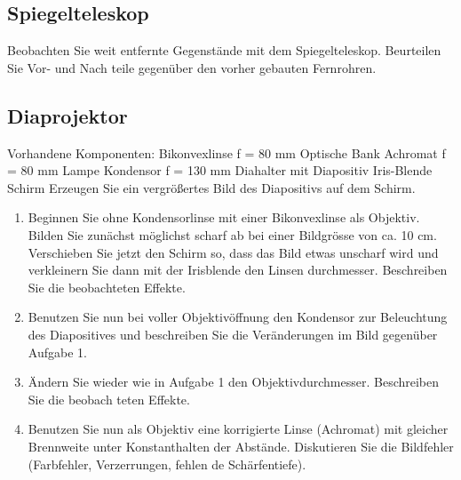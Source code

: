 \subsection{Spiegelteleskop}
Beobachten Sie weit entfernte Gegenstände mit dem Spiegelteleskop. Beurteilen Sie Vor- und Nach
teile gegenüber den vorher gebauten Fernrohren.
\subsection{Diaprojektor}
Vorhandene Komponenten: Bikonvexlinse f = 80 mm Optische Bank Achromat f = 80 mm Lampe
Kondensor f = 130 mm Diahalter mit Diapositiv Iris-Blende Schirm
Erzeugen Sie ein vergrößertes Bild des Diapositivs auf dem Schirm.
\begin{enumerate}
 \item  Beginnen Sie ohne Kondensorlinse mit einer Bikonvexlinse als Objektiv. Bilden Sie zunächst
 möglichst scharf ab bei einer Bildgrösse von ca. 10 cm. Verschieben Sie jetzt den Schirm so,
 dass das Bild etwas unscharf wird und verkleinern Sie dann mit der Irisblende den Linsen
 durchmesser. Beschreiben Sie die beobachteten Effekte.
 \item Benutzen Sie nun bei voller Objektivöffnung den Kondensor zur Beleuchtung des Diapositives
 und beschreiben Sie die Veränderungen im Bild gegenüber Aufgabe 1.
 \item Ändern Sie wieder wie in Aufgabe 1 den Objektivdurchmesser. Beschreiben Sie die beobach
 teten Effekte.
 \item Benutzen Sie nun als Objektiv eine korrigierte Linse (Achromat) mit gleicher Brennweite unter
 Konstanthalten der Abstände. Diskutieren Sie die Bildfehler (Farbfehler, Verzerrungen, fehlen
 de Schärfentiefe).
 
\end{enumerate}
